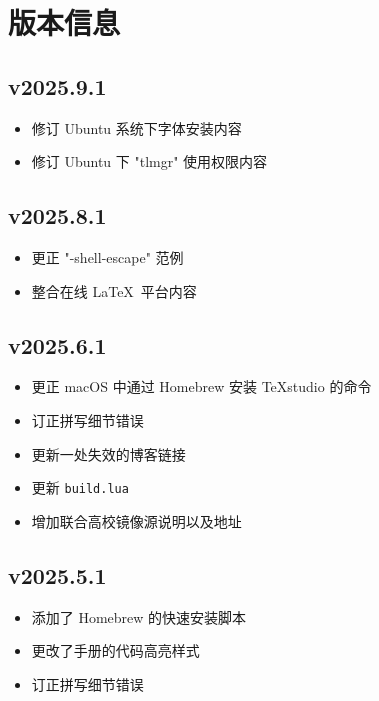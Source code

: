 
\twocolumn

\chapter{版本信息}

\section*{v2025.9.1}

\begin{itemize}
  \item 修订 Ubuntu 系统下字体安装内容
  \item 修订 Ubuntu 下 "tlmgr" 使用权限内容
\end{itemize}

\section*{v2025.8.1}

\begin{itemize}
  \item 更正 "-shell-escape" 范例
  \item 整合在线 \LaTeX\ 平台内容
\end{itemize}

\section*{v2025.6.1}

\begin{itemize}
  \item 更正 macOS 中通过 Homebrew 安装 \TeX studio 的命令
  \item 订正拼写细节错误
  \item 更新一处失效的博客链接
  \item 更新 \texttt{build.lua}
  \item 增加联合高校镜像源说明以及地址
\end{itemize}

\section*{v2025.5.1}

\begin{itemize}
  \item 添加了 Homebrew 的快速安装脚本
  \item 更改了手册的代码高亮样式
  \item 订正拼写细节错误
\end{itemize}


